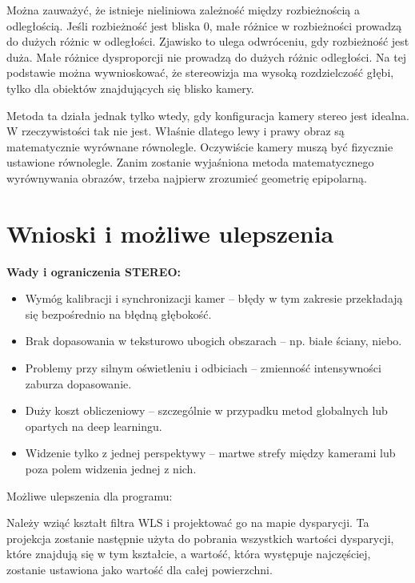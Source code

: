 \documentclass[magisterska]{pracadypl}
\begin{document}
Można zauważyć, że istnieje nieliniowa zależność między rozbieżnością a odległością.
Jeśli rozbieżność jest bliska 0, małe różnice w rozbieżności prowadzą do dużych różnic w odległości.
Zjawisko to ulega odwróceniu, gdy rozbieżność jest duża. Małe różnice dysproporcji nie prowadzą do dużych różnic odległości. Na tej podstawie można wywnioskować, że stereowizja ma wysoką rozdzielczość głębi, tylko dla obiektów znajdujących się blisko kamery.

Metoda ta działa jednak tylko wtedy, gdy konfiguracja kamery stereo jest idealna. W
rzeczywistości tak nie jest. Właśnie dlatego lewy i prawy obraz są
matematycznie wyrównane równolegle. Oczywiście kamery muszą być fizycznie ustawione równolegle.
Zanim zostanie wyjaśniona metoda matematycznego wyrównywania obrazów, trzeba najpierw zrozumieć geometrię epipolarną.

\section{Wnioski i możliwe ulepszenia}

\begin{minipage}[t]{\textwidth}
\textbf{Wady i ograniczenia STEREO:}
\begin{itemize}
  \item Wymóg kalibracji i synchronizacji kamer – błędy w tym zakresie przekładają się bezpośrednio na błędną głębokość.

  \item Brak dopasowania w teksturowo ubogich obszarach – np. białe ściany, niebo.

  \item Problemy przy silnym oświetleniu i odbiciach – zmienność intensywności zaburza dopasowanie.

  \item Duży koszt obliczeniowy – szczególnie w przypadku metod globalnych lub opartych na deep learningu.

  \item Widzenie tylko z jednej perspektywy – martwe strefy między kamerami lub poza polem widzenia jednej z nich.
\end{itemize}
\end{minipage}

Możliwe ulepszenia dla programu:

Należy wziąć kształt filtra WLS i projektować go na mapie dysparycji. Ta projekcja zostanie następnie użyta do pobrania wszystkich wartości dysparycji, które znajdują się w tym kształcie, a wartość, która występuje najczęściej, zostanie ustawiona jako wartość dla całej powierzchni.
\end{document}
